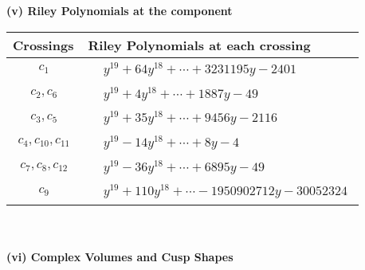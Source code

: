 \documentclass[1p]{elsarticle_modified}
\theoremstyle{definition}
\begin{document}
\newpage\renewcommand{\arraystretch}{1}
\flushleft \textbf{(v) Riley Polynomials at the component}\newline \\
\begin{tabular}{m{50pt}|m{274pt}}
Crossings & \hspace{64pt}Riley Polynomials at each crossing \\
\hline $$\begin{aligned}c_{1}\end{aligned}$$&$\begin{aligned}
&y^{19}+64 y^{18}+\cdots+3231195 y-2401
\end{aligned}$\\
\hline $$\begin{aligned}c_{2},c_{6}\end{aligned}$$&$\begin{aligned}
&y^{19}+4 y^{18}+\cdots+1887 y-49
\end{aligned}$\\
\hline $$\begin{aligned}c_{3},c_{5}\end{aligned}$$&$\begin{aligned}
&y^{19}+35 y^{18}+\cdots+9456 y-2116
\end{aligned}$\\
\hline $$\begin{aligned}c_{4},c_{10},c_{11}\end{aligned}$$&$\begin{aligned}
&y^{19}-14 y^{18}+\cdots+8 y-4
\end{aligned}$\\
\hline $$\begin{aligned}c_{7},c_{8},c_{12}\end{aligned}$$&$\begin{aligned}
&y^{19}-36 y^{18}+\cdots+6895 y-49
\end{aligned}$\\
\hline $$\begin{aligned}c_{9}\end{aligned}$$&$\begin{aligned}
&y^{19}+110 y^{18}+\cdots-1950902712 y-30052324
\end{aligned}$\\
\hline
\end{tabular}\\~\\
\newpage\flushleft \textbf{(vi) Complex Volumes and Cusp Shapes}
\end{document}
